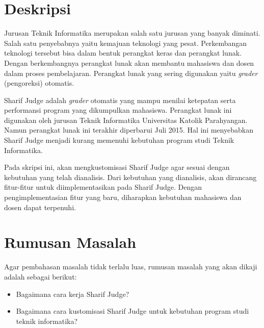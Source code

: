 \documentclass[a4paper,twoside]{article}
\begin{document}
\title{\@judultopik}
\author{\nama \textendash \@npm} 

\newcommand{\nama}{Stillmen Vallian}
\newcommand{\@npm}{2014730083}
\newcommand{\@judultopik}{Kustomisasi Sharif Judge untuk Kebutuhan Program Studi Teknik Informatika} %
\newcommand{\jumpemb}{1} %
\newcommand{\tanggal}{04/09/2017}


\maketitle


\section{Deskripsi}
Jurusan Teknik Informatika merupakan salah satu jurusan yang banyak diminati. Salah satu penyebabnya yaitu kemajuan teknologi yang pesat. Perkembangan teknologi tersebut bisa dalam bentuk perangkat keras dan perangkat lunak. Dengan berkembangnya perangkat lunak akan membantu mahasiswa dan dosen dalam proses pembelajaran. Perangkat lunak yang sering digunakan yaitu \textit{grader} (pengoreksi) otomatis.

Sharif Judge adalah \textit{grader} otomatis yang mampu menilai ketepatan serta performansi program yang dikumpulkan mahasiswa. Perangkat lunak ini digunakan oleh jurusan Teknik Informatika Universitas Katolik Parahyangan. Namun perangkat lunak ini terakhir diperbarui Juli 2015. Hal ini menyebabkan Sharif Judge menjadi kurang memenuhi kebutuhan program studi Teknik Informatika. 

Pada skripsi ini, akan mengkustomisasi Sharif Judge agar sesuai dengan kebutuhan yang telah dianalisis. Dari kebutuhan yang dianalisis, akan dirancang fitur-fitur untuk diimplementasikan pada Sharif Judge. Dengan pengimplementasian fitur yang baru, diharapkan kebutuhan mahasiswa dan dosen dapat terpenuhi.
\section{Rumusan Masalah}
Agar pembahasan masalah tidak terlalu luas, rumusan masalah yang akan dikaji adalah sebagai berikut:
\begin{itemize}
	\item Bagaimana cara kerja Sharif Judge?
	\item Bagaimana cara kustomisasi Sharif Judge untuk kebutuhan program studi teknik informatika?
\end{itemize}
\end{document}
